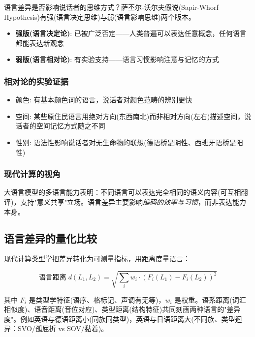 语言差异是否影响说话者的思维方式？萨丕尔-沃尔夫假说(Sapir-Whorf Hypothesis)有强(语言决定思维)与弱(语言影响思维)两个版本。

\begin{itemize}
    \item \textbf{强版(语言决定论)}: 已被广泛否定——人类普遍可以表达任意概念，任何语言都能表达新观念
    \item \textbf{弱版(语言相对论)}: 有实验支持——语言习惯影响注意与记忆的方式
\end{itemize}

\subsubsection{相对论的实验证据}

\begin{itemize}
    \item 颜色: 有基本颜色词的语言，说话者对颜色范畴的辨别更快
    \item 空间: 某些原住民语言用绝对方向(东西南北)而非相对方向(左右)描述空间，说话者的空间记忆方式随之不同
    \item 性别: 语法性影响说话者对无生命物的联想(德语桥是阴性、西班牙语桥是阳性)
\end{itemize}

\subsubsection{现代计算的视角}

大语言模型的多语言能力表明：不同语言可以表达完全相同的语义内容(可互相翻译)，支持"意义共享"立场。语言差异主要影响\emph{编码的效率与习惯}，而非表达能力本身。

\subsection{语言差异的量化比较}

现代计算类型学把差异转化为可测量指标，用距离度量语言：

\begin{equation}
    \text{语言距离} \; d(L_1, L_2) = \sqrt{\sum_{i} w_i \cdot (F_i(L_1) - F_i(L_2))^2}
\end{equation}

其中 $F_i$ 是类型学特征(语序、格标记、声调有无等)，$w_i$ 是权重。语系距离(词汇相似度)、语音距离(音位对应)、类型距离(结构特征)共同刻画两种语言的"差异度"。例如英语与德语距离小(同族同类型)，英语与日语距离大(不同族、类型迥异：SVO/孤屈折 vs SOV/黏着)。

